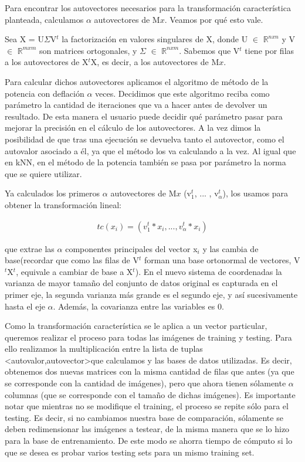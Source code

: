 \documentclass{article}
\begin{document}
Para encontrar los autovectores necesarios para la transformación característica planteada, calculamos $\alpha$ autovectores de M$x$. Veamos por qué esto vale.

Sea X = U$\Sigma$V$^t$ la factorización en valores singulares de X, donde U $\in$ $\mathbb{R}^{nxn}$ y V $\in$ $\mathbb{R}^{mxm}$ son matrices ortogonales, y $\Sigma$ $\in$ $\mathbb{R}^{nxm}$. Sabemos que V$^t$ tiene por filas a los autovectores de X$^t$X, es decir, a los autovectores de M$x$.

Para calcular dichos autovectores aplicamos el algoritmo de método de la potencia con deflación $\alpha$ veces. Decidimos que este algoritmo reciba como parámetro la cantidad de iteraciones que va a hacer antes de devolver un resultado. De esta manera el usuario puede decidir qué parámetro pasar para mejorar la precisión en el cálculo de los autovectores. A la vez dimos la posibilidad de que tras una ejecución se devuelva tanto el autovector, como el autovalor asociado a él, ya que el método los va calculando a la vez. Al igual que en kNN, en el método de la potencia también se pasa por parámetro la norma que se quiere utilizar.

Ya calculados los primeros $\alpha$  autovectores de M$x$ (v$_1^t$, ... , v$_\alpha^t$), los usamos para obtener la transformación lineal:

\begin{align*}
tc(x_i) = (v_1^t*x_i, ... , v_\alpha^t*x_i)
\end{align*}

que extrae las $\alpha$ componentes principales del vector x$_i$ y las cambia de base(recordar que como las filas de V$^t$ forman una base ortonormal de vectores, V$^t$X$^t$, equivale a cambiar de base a X$^t$). 
En el nuevo sistema de coordenadas la varianza de mayor tamaño del conjunto de datos original es capturada en el primer eje, la segunda varianza más grande es el segundo eje, y así sucesivamente hasta el eje $\alpha$. Además, la covarianza entre las variables es 0.

Como la transformación característica se le aplica a un vector particular, queremos realizar el proceso para todas las imágenes de training y testing. Para ello realizamos la multiplicación entre la lista de tuplas \textless autovalor,autovector\textgreater  que calculamos y las bases de datos utilizadas. Es decir, obtenemos dos nuevas matrices con la misma cantidad de filas que antes (ya que se corresponde con la cantidad de imágenes), pero que ahora tienen sólamente $\alpha$ columnas (que se corresponde con el tamaño de dichas imágenes).
Es importante notar que mientras no se modifique el training, el proceso se repite sólo para el testing. Es decir, si no cambiamos nuestra base de comparación, sólamente se deben redimensionar las imágenes a testear, de la misma manera que se lo hizo para la base de entrenamiento. De este modo se ahorra tiempo de cómputo si lo que se desea es probar varios testing sets para un mismo training set.
\end{document}
